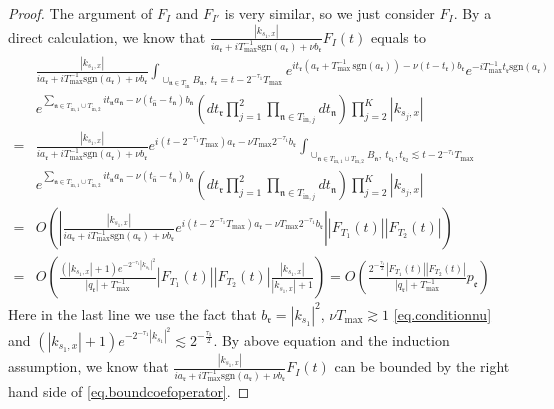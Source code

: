 \begin{proof}
The argument of $F_{I}$ and $F_{I'}$ is very similar, so we just consider $F_{I}$. By a direct calculation, we know that $\frac{|k_{s_1,x}|}{ia_{\mathfrak{r}}+iT^{-1}_{\text{max}} \text{sgn}(a_{\mathfrak{r}})+\nu b_{\mathfrak{r}} }F_{I}(t)$ equals to
\begin{equation}
    \begin{split}
        &\frac{|k_{s_1,x}|}{ia_{\mathfrak{r}}+iT^{-1}_{\text{max}} \text{sgn}(a_{\mathfrak{r}})+\nu b_{\mathfrak{r}} } \int_{\cup_{\mathfrak{n}\in T_{\text{in}}} B_{\mathfrak{n}},\ t_{\mathfrak{r}}=t-2^{-\tau_{1}}T_{\text{max}}} e^{it_{\mathfrak{r}}(a_{\mathfrak{r}}+T^{-1}_{\text{max}}\, \text{sgn}(a_{\mathfrak{r}}))- \nu(t-t_{\mathfrak{r}})b_{\mathfrak{r}}} e^{-iT^{-1}_{\text{max}}t_{\mathfrak{r}} \text{sgn}(a_{\mathfrak{r}})} 
        \\
        &e^{\sum_{\mathfrak{n}\in T_{\text{in},1}\cup T_{\text{in},2}} it_{\mathfrak{n}} a_{\mathfrak{n}} - \nu(t_{\widehat{\mathfrak{n}}}-t_{\mathfrak{n}})b_{\mathfrak{n}}} \left(dt_{\mathfrak{r}}\prod_{j=1}^2\prod_{\mathfrak{n}\in T_{\text{in},j}}dt_{\mathfrak{n}}  \right)\prod^K_{j=2}|k_{s_j,x}|
        \\
        =&\frac{|k_{s_1,x}|}{ia_{\mathfrak{r}}+iT^{-1}_{\text{max}} \text{sgn}(a_{\mathfrak{r}})+\nu b_{\mathfrak{r}} }  e^{i(t-2^{-\tau_{1}}T_{\text{max}})a_{\mathfrak{r}}- \nu T_{\text{max}} 2^{-\tau_{1}}b_{\mathfrak{r}}}\int_{\cup_{\mathfrak{n}\in T_{\text{in},1}\cup T_{\text{in},2}} B_{\mathfrak{n}},\ t_{\mathfrak{r}_1}, t_{\mathfrak{r}_2}\lesssim t-2^{-\tau_{1}}T_{\text{max}}}
        \\
        &  e^{\sum_{\mathfrak{n}\in T_{\text{in},1}\cup T_{\text{in},2}} it_{\mathfrak{n}} a_{\mathfrak{n}} - \nu(t_{\widehat{\mathfrak{n}}}-t_{\mathfrak{n}})b_{\mathfrak{n}}}\left(dt_{\mathfrak{r}}\prod_{j=1}^2\prod_{\mathfrak{n}\in T_{\text{in},j}}dt_{\mathfrak{n}}  \right)\prod^K_{j=2}|k_{s_j,x}|
        \\
        =&O\left(\left|\frac{|k_{s_1,x}|}{ia_{\mathfrak{r}}+iT^{-1}_{\text{max}} \text{sgn}(a_{\mathfrak{r}})+\nu b_{\mathfrak{r}} }  e^{i(t-2^{-\tau_{1}}T_{\text{max}})a_{\mathfrak{r}}- \nu T_{\text{max}} 2^{-\tau_{1}}b_{\mathfrak{r}}}\right||F_{T_1}(t)| |F_{T_2}(t)|\right)
        \\
        =&O\left(\frac{(|k_{s_1,x}|+1)e^{- 2^{-\tau_{1}}|k_{s_1}|^2} }{|q_{\mathfrak{r}}|+T^{-1}_{\text{max}}} |F_{T_1}(t)| |F_{T_2}(t)|\frac{|k_{s_1,x}|}{|k_{s_1,x}|+1}\right)=O\left(\frac{2^{-\frac{\tau_{1}}{2}}|F_{T_1}(t)| |F_{T_2}(t)|}{|q_{\mathfrak{r}}|+T^{-1}_{\text{max}}}p_{\mathfrak{e}}\right)
    \end{split}
\end{equation}
Here in the last line we use the fact that $b_{\mathfrak{r}}=|k_{s_1}|^2$, $\nu T_{\text{max}}\gtrsim 1$ \eqref{eq.conditionnu} and $(|k_{s_1,x}|+1)e^{- 2^{-\tau_{1}}|k_{s_1}|^2} \lesssim 2^{-\frac{\tau_{1}}{2}}$. By above equation and the induction assumption, we know that $\frac{|k_{s_1,x}|}{ia_{\mathfrak{r}}+iT^{-1}_{\text{max}} \text{sgn}(a_{\mathfrak{r}})+\nu b_{\mathfrak{r}} }F_{I}(t)$ can be bounded by the right hand side of \eqref{eq.boundcoefoperator}.


\end{proof}
